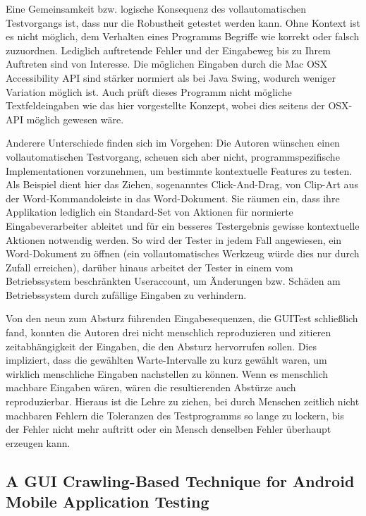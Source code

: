 Eine Gemeinsamkeit bzw. logische Konsequenz des vollautomatischen Testvorgangs ist, dass nur
die Robustheit getestet werden kann. Ohne Kontext ist es nicht möglich, dem Verhalten eines
Programms Begriffe wie \glqq{}korrekt\grqq{} oder \glqq{}falsch\grqq{} zuzuordnen. Lediglich auftretende
Fehler und der Eingabeweg bis zu Ihrem Auftreten sind von Interesse.
Die möglichen Eingaben durch die \glqq{}Mac OSX Accessibility API\grqq{} sind stärker normiert als bei
Java Swing, wodurch weniger Variation möglich ist. Auch prüft dieses Programm nicht mögliche
Textfeldeingaben wie das hier vorgestellte Konzept, wobei dies seitens der OSX-API möglich gewesen wäre.

Anderere Unterschiede finden sich im Vorgehen: Die Autoren wünschen einen vollautomatischen
Testvorgang, scheuen sich aber nicht, programmspezifische Implementationen vorzunehmen, um
bestimmte kontextuelle Features zu testen. Als Beispiel dient hier das Ziehen, sogenanntes
\glqq{}Click-And-Drag\grqq{}, von Clip-Art aus der Word-Kommandoleiste in das Word-Dokument.
Sie räumen ein, dass ihre Applikation lediglich ein Standard-Set von Aktionen für
normierte Eingabeverarbeiter ableitet und für ein besseres Testergebnis gewisse
kontextuelle Aktionen notwendig werden. So wird der Tester in jedem Fall angewiesen,
ein Word-Dokument zu öffnen (ein vollautomatisches Werkzeug würde dies nur durch Zufall erreichen),
darüber hinaus arbeitet der Tester in einem vom Betriebssystem beschränkten Useraccount,
um Änderungen bzw. Schäden am Betriebssystem durch zufällige Eingaben zu verhindern.

Von den neun zum Absturz führenden Eingabesequenzen, die GUITest schließlich fand,
konnten die Autoren drei nicht menschlich reproduzieren und zitieren zeitabhängigkeit
der Eingaben, die den Absturz hervorrufen sollen. Dies impliziert, dass die gewählten Warte-Intervalle
zu kurz gewählt waren, um wirklich menschliche Eingaben nachstellen zu können. Wenn es
menschlich machbare Eingaben wären, wären die resultierenden Abstürze auch reproduzierbar.
Hieraus ist die Lehre zu ziehen, bei durch Menschen zeitlich nicht machbaren Fehlern die Toleranzen
des Testprogramms so lange zu lockern, bis der Fehler nicht mehr auftritt oder ein Mensch
denselben Fehler überhaupt erzeugen kann.


\subsection{A GUI Crawling-Based Technique for Android Mobile Application Testing}

